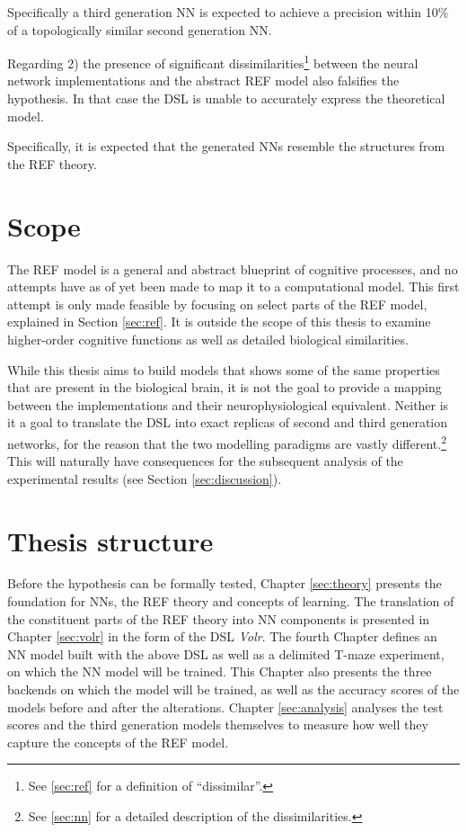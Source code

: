 \documentclass[report.tex]{subfiles}
\begin{document}
Specifically a third generation \gls{NN} is expected to
achieve a precision within 10\% of a topologically similar
second generation \gls{NN}.

Regarding 2) the presence of significant
dissimilarities\footnote{See \ref{sec:ref} for a definition of
\enquote{dissimilar}.} between the neural network implementations 
and the abstract \gls{REF} model also falsifies the hypothesis. 
In that case the \gls{DSL} is unable to accurately express the
theoretical model.

Specifically, it is expected that the generated \gls{NN}s resemble
the structures from the \gls{REF} theory.

\section{Scope} \label{sec:scope}
The \gls{REF} model is a general and abstract blueprint of cognitive
processes, and no attempts have as of yet been made to map it to
a computational model.
This first attempt is only made feasible by focusing on select parts
of the \gls{REF} model, explained in Section \ref{sec:ref}.
It is outside the scope of this thesis to examine
higher-order cognitive functions as well as detailed biological
similarities.

While this thesis aims to build models that shows some of the same
properties that are present in the biological brain,  
it is not the goal to provide a mapping between the
implementations and their neurophysiological equivalent.
Neither is it a goal to translate the \gls{DSL} into exact replicas
of second and third generation networks, for the reason that the
two modelling paradigms are vastly different.\footnote{See \ref{sec:nn}
for a detailed description of the dissimilarities.}
This will naturally have consequences for the subsequent analysis of the
experimental results (see Section \ref{sec:discussion}).

\section{Thesis structure}
Before the hypothesis can be formally tested, Chapter \ref{sec:theory}
presents the foundation for \gls{NN}s, the \gls{REF} theory and
concepts of learning.
The translation of the constituent parts of the \gls{REF} theory
into \gls{NN} components is presented in Chapter \ref{sec:volr} in 
the form of the \gls{DSL} \textit{Volr}. 
The fourth Chapter defines an \gls{NN} model built with the above
\gls{DSL} as well as a delimited T-maze experiment, on which the 
\gls{NN} model will be trained.
This Chapter also presents the three \gls{backend}s on which the 
model will be trained, as well as the accuracy scores of the models
before and after the alterations.
Chapter \ref{sec:analysis} analyses the test scores and the third 
generation models themselves to measure how well they capture the
concepts of the \gls{REF} model.
\end{document}
